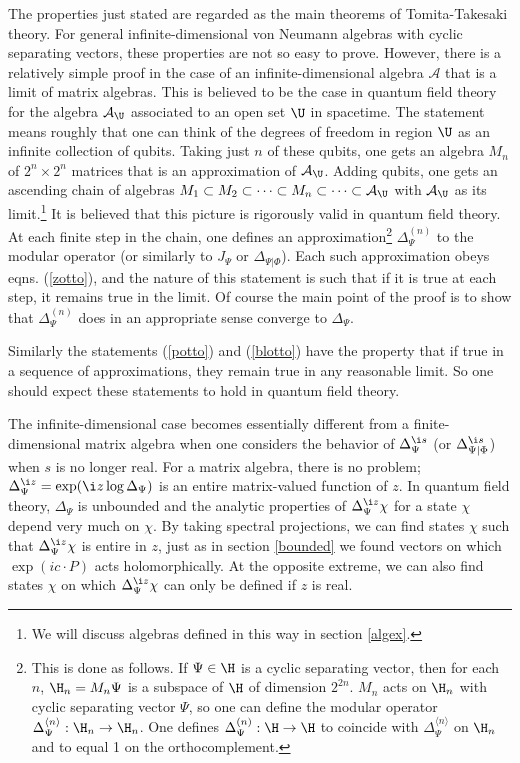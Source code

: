 \documentclass[12pt]{article}
\def\ra{\rangle}
\def\la{\langle}
\numberwithin{equation}{section}
\def\A{{\mathcal A}}
\begin{document}
The properties just stated are regarded as the main theorems of Tomita-Takesaki theory.  For general infinite-dimensional von Neumann
algebras with cyclic separating vectors, these properties are not so easy to prove.  However, there is a relatively simple proof
\cite{LongoSImpleProof} in the case of an infinite-dimensional algebra $\A$ that is a limit of matrix algebras.  This is believed to be the
case in quantum field theory for the algebra $\A_\U$ associated to an open set $\U$ in spacetime.    The statement means roughly
that one can think of the degrees of freedom in region $\U$ as an infinite collection of qubits.  Taking just $n$ of these qubits,
one gets an algebra $M_n$ of $2^n\times 2^n$ matrices that is an approximation of $\A_\U$.  Adding qubits, one gets an ascending chain
of algebras $M_1\subset M_2\subset \cdots \subset M_n\subset \cdots \subset\A_\U$ with $\A_\U$ as its limit.\footnote{We will
discuss algebras defined in this way in section \ref{algex}.}  It is believed that this
picture is rigorously valid in quantum field theory.
At each finite step
in the chain, one defines an approximation\footnote{This is done as follows.  If $\Psi\in \H$ is a cyclic
separating vector, then for each $n$, $\H_n=M_n\Psi$  is a subspace of $\H$ of dimension $2^{2n}$.
$M_n$ acts on $\H_n$ with cyclic separating vector $\Psi$, so one can define the modular operator $\Delta_\Psi^{\la n\ra}:\H_n\to \H_n$.
One defines $\Delta_\Psi^{(n)}:\H\to\H$ to coincide with $\Delta_\Psi^{\la n\ra}$ on $\H_n$ and to equal 1 on the orthocomplement.}
    $\Delta_\Psi^{(n)}$ to the  modular operator (or similarly  to $J_\Psi$ or $\Delta_{\Psi|\Phi}$).   Each such approximation obeys
    eqns. (\ref{zotto}), and the nature of this statement is such that if it is true at each step, it remains true in the limit.  Of course
    the main point of the proof is to show that $\Delta_\Psi^{(n)}$ does in an appropriate sense converge to $\Delta_\Psi$.
    
    Similarly the statements (\ref{potto}) and (\ref{blotto}) have the property that if true in a sequence of approximations, they remain
    true in any reasonable limit.  So one should expect these statements to hold in quantum field theory.
    
    The infinite-dimensional case becomes essentially different from a finite-dimensional matrix algebra when one considers the
    behavior of $\Delta_\Psi^{\i s }$ (or $\Delta_{\Psi|\Phi}^{\i s}$) when $s$ is no longer real.  For a matrix algebra, there is no problem;
    $\Delta_\Psi^{\i z}=\exp(\i z\log \Delta_\Psi)$ is an entire matrix-valued function of $z$.   In quantum field theory, 
    $\Delta_\Psi$ is unbounded and
    the analytic properties of $\Delta_\Psi^{\i z }\chi$ for a state $\chi$ depend very much on $\chi$.  By taking spectral projections, we can
    find states $\chi$ such that $\Delta_\Psi^{\i z}\chi$ is entire in $z$, just as in section \ref{bounded} we found vectors
    on which $\exp(ic\cdot P)$ acts holomorphically.    At the opposite extreme, we can also find states $\chi$ on 
    which $\Delta_\Psi^{\i z}\chi$ can only be defined if
    $z$ is real.
    
\end{document}
